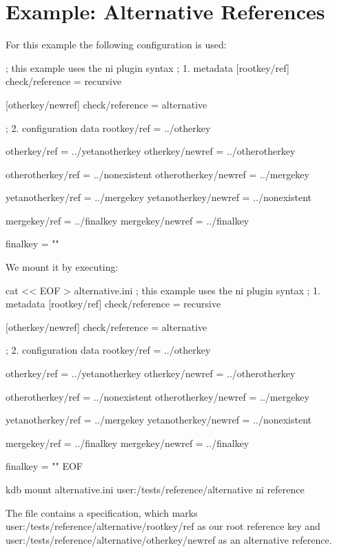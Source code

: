 \hypertarget{autotoc_md561_src_plugins_reference_examples_alternative_README_md}{}\section{Example\+: Alternative References}\label{autotoc_md561_src_plugins_reference_examples_alternative_README_md}
For this example the following configuration is used\+:


\begin{DoxyCode}
; this example uses the ni plugin syntax
; 1. metadata
[rootkey/ref]
check/reference = recursive

[otherkey/newref]
check/reference = alternative

; 2. configuration data
rootkey/ref = ../otherkey

otherkey/ref = ../yetanotherkey
otherkey/newref = ../otherotherkey

otherotherkey/ref = ../nonexistent
otherotherkey/newref = ../mergekey

yetanotherkey/ref = ../mergekey
yetanotherkey/newref = ../nonexistent

mergekey/ref = ../finalkey
mergekey/newref = ../finalkey

finalkey = ""
\end{DoxyCode}


We mount it by executing\+:


\begin{DoxyCode}
cat << EOF > alternative.ini
; this example uses the ni plugin syntax
; 1. metadata
[rootkey/ref]
check/reference = recursive

[otherkey/newref]
check/reference = alternative

; 2. configuration data
rootkey/ref = ../otherkey

otherkey/ref = ../yetanotherkey
otherkey/newref = ../otherotherkey

otherotherkey/ref = ../nonexistent
otherotherkey/newref = ../mergekey

yetanotherkey/ref = ../mergekey
yetanotherkey/newref = ../nonexistent

mergekey/ref = ../finalkey
mergekey/newref = ../finalkey

finalkey = ""
EOF

kdb mount alternative.ini user:/tests/reference/alternative ni reference
\end{DoxyCode}


The file contains a specification, which marks {\ttfamily user\+:/tests/reference/alternative/rootkey/ref} as our root reference key and {\ttfamily user\+:/tests/reference/alternative/otherkey/newref} as an alternative reference.


